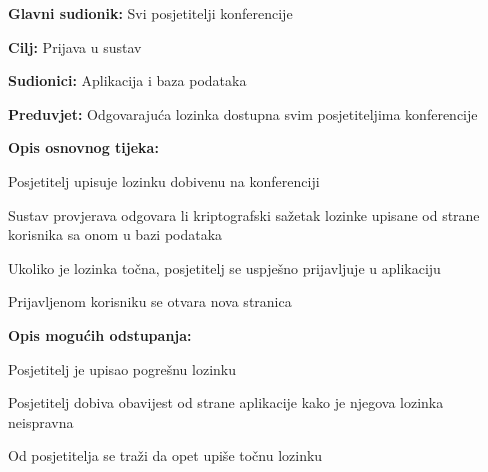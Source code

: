 					
					\noindent {}
					\begin{packed_item}
						
						\item \textbf{Glavni sudionik: } Svi posjetitelji konferencije
						\item  \textbf{Cilj:} Prijava u sustav
						\item  \textbf{Sudionici:} Aplikacija i baza podataka
						\item  \textbf{Preduvjet:} Odgovarajuća lozinka dostupna svim posjetiteljima konferencije
						\item  \textbf{Opis osnovnog tijeka:}
						
						\item[] \begin{packed_enum}
							
							\item Posjetitelj upisuje lozinku dobivenu na konferenciji 
							\item Sustav provjerava odgovara li kriptografski sažetak lozinke upisane od strane korisnika sa onom u bazi podataka
							\item Ukoliko je lozinka točna, posjetitelj se uspješno prijavljuje u aplikaciju
							\item Prijavljenom korisniku se otvara nova stranica
						\end{packed_enum}
						
						\item  \textbf{Opis mogućih odstupanja:}
						
						\item[] \begin{packed_item}
							
							\item[1.a] Posjetitelj je upisao pogrešnu lozinku
							\item[] \begin{packed_enum}
								
								\item Posjetitelj dobiva obavijest od strane aplikacije kako je njegova lozinka neispravna
								\item Od posjetitelja se traži da opet upiše točnu lozinku
								
							\end{packed_enum}
						
							
						\end{packed_item}
					\end{packed_item}
					
